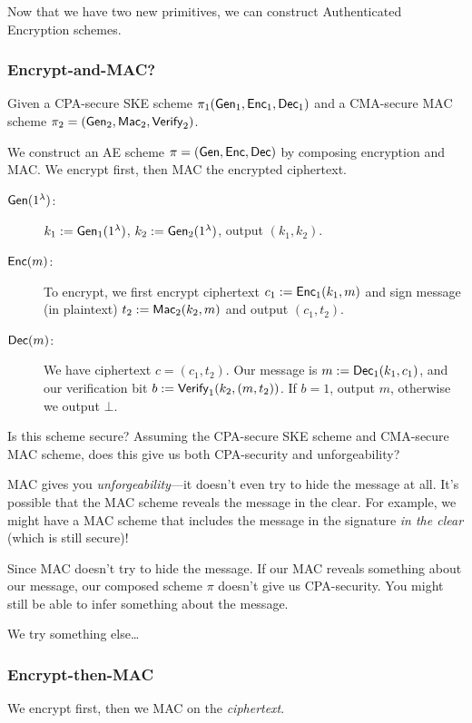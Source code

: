 
Now that we have two new primitives, we can construct Authenticated Encryption schemes.

\subsubsection{Encrypt-and-MAC?}
Given a CPA-secure SKE scheme $\pi_1(\operatorname{\mathsf{Gen}}_1, \operatorname{\mathsf{Enc}}_1, \operatorname{\mathsf{Dec}}_1)$ and a CMA-secure MAC scheme $\pi_2 = (\operatorname{\mathsf{Gen}}_2, \operatorname{\mathsf{Mac}}_2, \operatorname{\mathsf{Verify}}_2)$.

We construct an AE scheme $\pi = (\operatorname{\mathsf{Gen}}, \operatorname{\mathsf{Enc}}, \operatorname{\mathsf{Dec}})$ by composing encryption and MAC. We encrypt first, then MAC the encrypted ciphertext.


\begin{description}
    \item[$\operatorname{\mathsf{Gen}}(1^\lambda)$:] $k_1:=\operatorname{\mathsf{Gen}}_1(1^\lambda)$, $k_2:=\operatorname{\mathsf{Gen}}_2(1^\lambda)$, output $(k_1, k_2)$.

    \item[$\operatorname{\mathsf{Enc}}(m)$:] To encrypt, we first encrypt ciphertext $c_1 := \operatorname{\mathsf{Enc}}_1(k_1, m)$ and sign message (in plaintext) $t_2 := \operatorname{\mathsf{Mac}}_2(k_2, m)$ and output $(c_1, t_2)$.

    \item[$\operatorname{\mathsf{Dec}}(m)$:] We have ciphertext $c = (c_1, t_2)$. Our message is $m:=\operatorname{\mathsf{Dec}}_1(k_1, c_1)$, and our verification bit $b := \operatorname{\mathsf{Verify}}_1(k_2, (m, t_2))$. If $b = 1$, output $m$, otherwise we output $\bot$.
\end{description}

\begin{ques*}
    Is this scheme secure? Assuming the CPA-secure SKE scheme and CMA-secure MAC scheme, does this give us both CPA-security and unforgeability?
\end{ques*}

MAC gives you \emph{unforgeability}---it doesn't even try to hide the message at all. It's possible that the MAC scheme reveals the message in the clear. For example, we might have a MAC scheme that includes the message in the signature \emph{in the clear} (which is still secure)!

Since MAC doesn't try to hide the message. If our MAC reveals something about our message, our composed scheme $\pi$ doesn't give us CPA-security. You might still be able to infer something about the message.

We try something else\dots

\subsubsection{Encrypt-then-MAC}
We encrypt first, then we MAC on the \emph{ciphertext}.

